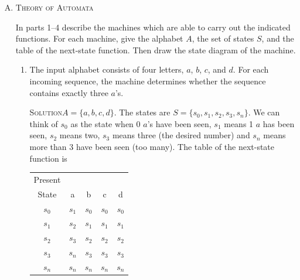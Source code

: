 \documentclass[twoside]{amsart}
\newcommand{\solution}{\textsc{Solution}\xspace}
\begin{document}
\begin{enumerate}[A.]
\begin{enumerate}[1]
      $f$ is surjective.
      \begin{proof}
      Pick some element $y \in B$. Then $y = f(x)$ for $x=g(y)$. 
      Thus, every element $y \in B$ is equal to $f(x)$ for $x=g(y)$.
      Therefore $f$ is surjective.
      \end{proof}

      Since $f$ is injective and surjective it is bijective.

      To prove that $g=f^{-1}$ we must show that $x=g(y)$ if and only if
      $y=f(x)$. This is given.

   \end{enumerate}

   \item \textsc{Theory of Automata}

   In parts 1--4 describe the machines which are able to carry out the 
   indicated functions. For each machine, give the alphabet $A$, 
   the set of states $S$, and the table of the next-state function. Then draw
   the state diagram of the machine.

   \begin{enumerate}[1]
      \item The input alphabet consists of four letters, $a$, $b$, $c$,
      and $d$. For each incoming sequence, the machine determines 
      whether the sequence contains exactly three $a$'s.

      \noindent \solution $A=\{a,b,c,d\}$. The states are 
      $S=\{s_0,s_1,s_2,s_3,s_n\}$. We can think of $s_0$ as the state
      when 0 $a$'s have been seen, $s_1$ means 1 $a$ has been seen,
      $s_2$ means two, $s_3$ means three (the desired number) and 
      $s_n$ means more than 3 have been seen (too many).
      The table of the next-state function
      is

      \vspace{5pt}
      \begin{center}
         \begin{tabular}{c|cccc}
	    Present & \\
	    State &   a   &   b   &   c   &   d   \\ \hline
	    $s_0$ & $s_1$ & $s_0$ & $s_0$ & $s_0$ \\
	    $s_1$ & $s_2$ & $s_1$ & $s_1$ & $s_1$ \\
	    $s_2$ & $s_3$ & $s_2$ & $s_2$ & $s_2$ \\
	    $s_3$ & $s_n$ & $s_3$ & $s_3$ & $s_3$ \\
	    $s_n$ & $s_n$ & $s_n$ & $s_n$ & $s_n$
	 \end{tabular}
      \end{center}
      \vspace{5pt}


\end{enumerate}
\end{enumerate}
\end{document}
